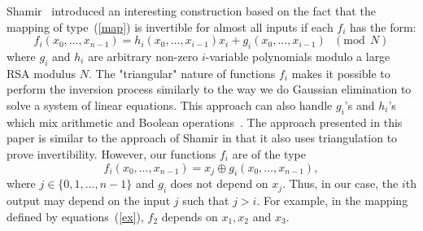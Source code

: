 \documentclass[9pt,conference]{IEEEtran} \usepackage{times}
\begin{document}
Shamir~\cite{Sh93} introduced an interesting construction based on the fact that the mapping of type~(\ref{map}) 
is invertible for almost all inputs if each $f_i$ has the form:
\[
f_i(x_0,\ldots,x_{n-1}) = h_i(x_0,\ldots,x_{i-1}) x_i + g_i(x_0,\ldots,x_{i-1}) ~~~ (\mbox{mod} ~~ N)
\]
where $g_i$ and $h_i$ are arbitrary non-zero $i$-variable polynomials modulo a large RSA modulus $N$.
The "triangular" nature of functions $f_i$ makes it possible to perform
the inversion process similarly to the way we do Gaussian elimination
to solve a system of linear equations. 
This approach can also handle 
$g_i$'s and $h_i$'s which mix arithmetic and Boolean operations~\cite{KlS02,Kl05}. The approach presented in this paper is similar to the approach of Shamir in that it also uses triangulation to prove invertibility. However, our functions $f_i$ are of the type
\begin{equation} \label{el_eq}
f_i(x_0,\ldots,x_{n-1}) = x_j \oplus g_i(x_0,\ldots,x_{n-1}),
\end{equation}
where $j \in \{0,1,\ldots,n-1\}$ and $g_i$ does not depend on $x_j$.
Thus, in our case, the $i$th output may depend on the input $j$ such that $j > i$.
For example, in the mapping defined by equations~(\ref{ex}), 
$f_2$ depends on $x_1,x_2$ and $x_3$.
\end{document}
